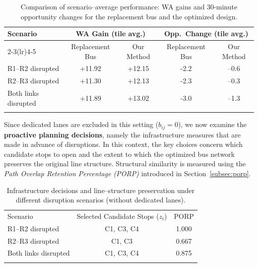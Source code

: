 \documentclass[3p,times,procedia]{elsarticle}
\begin{document}
\begin{table}[h]
\caption{Comparison of scenario--average performance: WA gains and 30-minute opportunity changes for the replacement bus and the optimized design.}
\label{tab:wa_scenarios}
\begin{tabular*}{\hsize}{@{\extracolsep{\fill}}lcccc@{}}
\toprule
Scenario & \multicolumn{2}{c}{WA Gain (tile avg.)} & \multicolumn{2}{c}{Opp.\ Change (tile avg.)}\\
\cmidrule(lr){2-3}\cmidrule(lr){4-5}
& Replacement Bus & Our Method & Replacement Bus & Our Method \\
\colrule
R1--R2 disrupted          & +11.92 & +12.15 & -2.2 & --0.6 \\
R2--R3 disrupted          & +11.30 & +12.13 & -2.3 & --0.3 \\
Both links disrupted      & +11.89 & +13.02 & -3.0 & --1.3 \\
\botrule
\end{tabular*}
\end{table}


Since dedicated lanes are excluded in this setting ($b_{ij}=0$), we now examine the \textbf{proactive planning decisions}, namely the infrastructure measures that are made in advance of disruptions. In this context, the key choices concern which candidate stops to open and the extent to which the optimized bus network preserves the original line structure. Structural similarity is measured using the \emph{Path Overlap Retention Percentage (PORP)} introduced in Section~\ref{subsec:porp}.

\begin{table}[h]
\caption{Infrastructure decisions and line–structure preservation under
different disruption scenarios (without dedicated lanes).}
\label{tab:infra_decisions}
\begin{tabular*}{\hsize}{@{\extracolsep{\fill}}lcc@{}}
\toprule
Scenario & Selected Candidate Stops ($z_i$) & PORP \\ 
\colrule
R1--R2 disrupted     & C1, C3, C4 & 1.000 \\
R2--R3 disrupted     & C1, C3     & 0.667 \\
Both links disrupted & C1, C3, C4 & 0.875 \\
\botrule
\end{tabular*}
\end{table}
\end{document}
